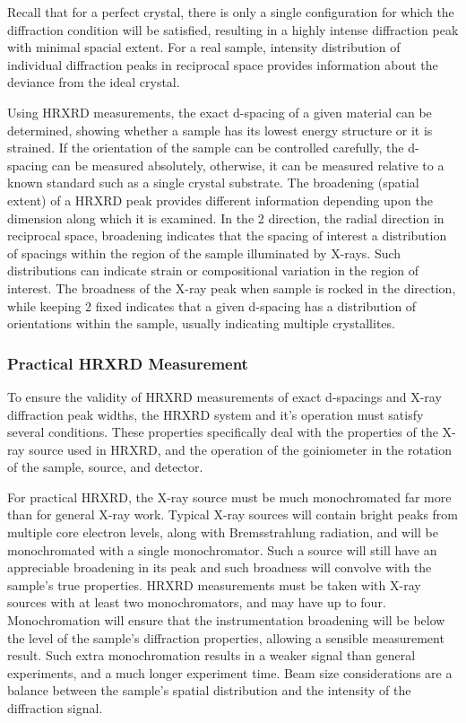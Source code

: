 Recall that for a perfect crystal, there is only a single configuration for which the diffraction condition will be satisfied, resulting in a highly intense diffraction peak with minimal spacial extent.
For a real sample, intensity distribution of individual diffraction peaks in reciprocal space provides information about the deviance from the ideal crystal.

Using HRXRD measurements, the exact d-spacing of a given material can be determined, showing whether a sample has its lowest energy structure or it is strained.
If the orientation of the sample can be controlled carefully, the d-spacing can be measured absolutely, otherwise, it can be measured relative to a known standard such as a single crystal substrate.
The broadening (spatial extent) of a HRXRD peak provides different information depending upon the dimension along which it is examined.
In the 2\straighttheta{} direction, the radial direction in reciprocal space, broadening indicates that the spacing of interest a distribution of spacings within the region of the sample illuminated by X-rays.
Such distributions can indicate strain or compositional variation in the region of interest.
The broadness of the X-ray peak when sample is rocked in the \textomega{} direction, while keeping 2\straighttheta{} fixed indicates that a given d-spacing has a distribution of orientations within the sample, usually indicating multiple crystallites.

\subsubsection{Practical HRXRD Measurement} To ensure the validity of HRXRD measurements of exact d-spacings and X-ray diffraction peak widths, the HRXRD system and it's operation must satisfy several conditions.
These properties specifically deal with the properties of the X-ray source used in HRXRD, and the operation of the goiniometer in the rotation of the sample, source, and detector.

For practical HRXRD, the X-ray source must be much monochromated far more than for general X-ray work.
Typical X-ray sources will contain bright peaks from multiple core electron levels, along with Bremsstrahlung radiation, and will be monochromated with a single monochromator.
Such a source will still have an appreciable broadening in its peak and such broadness will convolve with the sample's true properties.
HRXRD measurements must be taken with X-ray sources with at least two monochromators, and may have up to four.
Monochromation will ensure that the instrumentation broadening will be below the level of the sample's diffraction properties, allowing a sensible measurement result.
Such extra monochromation results in a weaker signal than general experiments, and a much longer experiment time.
Beam size considerations are a balance between the sample's spatial distribution and the intensity of the diffraction signal.

